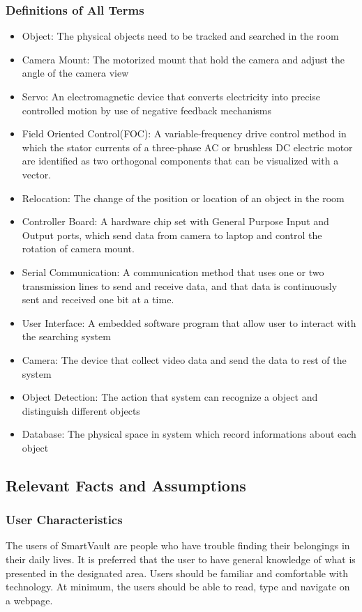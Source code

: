 \documentclass[12pt]{article}
\begin{document}
	\subsubsection{Definitions of All Terms}
		\begin{itemize}
			\item Object: The physical objects need to be tracked and searched in the room
			\item Camera Mount: The motorized mount that hold the camera and adjust the angle of the camera view
			\item Servo: An electromagnetic device that converts electricity into precise controlled motion by use of negative feedback mechanisms
			\item Field Oriented Control(FOC): A variable-frequency drive control method in which the stator currents of a three-phase AC or brushless DC electric motor are identified as two orthogonal components that can be visualized with a vector.
			\item Relocation: The change of the position or location of an object in the room
			\item Controller Board: A hardware chip set with General Purpose Input and Output ports, which send data from camera to laptop and control the rotation of camera mount.
			\item Serial Communication: A communication method that uses one or two transmission lines to send and receive data, and that data is continuously sent and received one bit at a time.
			\item User Interface: A embedded software program that allow user to interact with the searching system
			\item Camera: The device that collect video data and send the data to rest of the system
			\item Object Detection: The action that system can recognize a object and distinguish different objects
			\item Database: The physical space in system which record informations about each object

			
		\end{itemize}



\subsection{Relevant Facts and Assumptions}




\subsubsection{User Characteristics}
The users of SmartVault are people who have trouble finding their belongings in their daily lives. It is preferred that the user to have general knowledge of what is presented in the designated area. Users should be familiar and comfortable with technology. At minimum, the users should be able to read, type and navigate on a webpage. 
\end{document}
